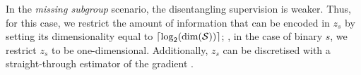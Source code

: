 %
In the \emph{missing subgroup} scenario, the disentangling supervision is weaker.
Thus, for this case, we restrict the amount of information that can be encoded in $z_s$ by setting its dimensionality equal to $\lceil \text{log}_2(\text{dim}(\mathcal{S})) \rceil$;
\eg, in the case of binary $s$, we restrict $z_s$ to be one-dimensional.
Additionally, $z_s$ can be discretised with a straight-through estimator of the gradient \citep{bengio2013estimating}.

